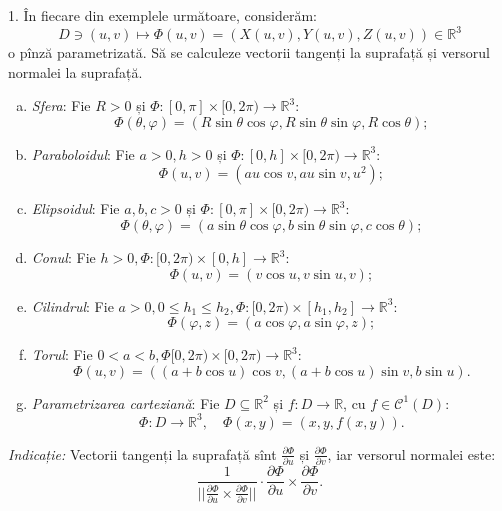 \documentclass[11pt,a4paper]{article}
\newcommand\kal{\mathcal}
\newcommand\seq{\subseteq}
\newcommand\RR{\mathbb{R}}
\theoremstyle{dotless}
\theoremstyle{dotlessdr}
\begin{document}
1. În fiecare din exemplele următoare, considerăm:
\[
  D \ni (u,v) \mapsto \Phi(u,v) = (X(u,v), Y(u,v), Z(u,v)) \in \RR^3
\]
o pînză parametrizată. Să se calculeze vectorii tangenți la suprafață și
versorul normalei la suprafață.

\begin{enumerate}[(a)]
\item \emph{Sfera}: Fie $R > 0$ și $\Phi : [0, \pi] \times [0, 2\pi) \to \RR^3$:
  \[
    \Phi(\theta, \varphi) = (R\sin \theta \cos \varphi, R \sin \theta \sin \varphi, R \cos \theta);
  \]
\item \emph{Paraboloidul}: Fie $a > 0, h > 0$ și $\Phi : [0, h] \times [0, 2\pi) \to \RR^3$:
  \[
    \Phi(u, v) = (au\cos v, au\sin v, u^2);
  \]
\item \emph{Elipsoidul}: Fie $a, b, c > 0$ și $\Phi : [0, \pi] \times [0, 2\pi) \to \RR^3$:
  \[
    \Phi(\theta, \varphi) = (a \sin\theta \cos \varphi, b \sin \theta \sin \varphi, c \cos \theta);
  \]
\item \emph{Conul}: Fie $h > 0, \Phi : [0, 2\pi) \times [0, h] \to \RR^3$:
  \[
    \Phi(u, v) = (v \cos u, v \sin u, v);
  \]
\item \emph{Cilindrul}: Fie $a > 0, 0 \leq h_1 \leq h_2, \Phi : [0, 2\pi) \times [h_1, h_2] \to \RR^3$:
  \[
    \Phi(\varphi, z) = (a \cos \varphi, a \sin \varphi, z);
  \]
\item \emph{Torul}: Fie $0 < a < b, \Phi [0, 2\pi) \times [0, 2\pi) \to \RR^3$:
  \[
    \Phi(u, v) = ((a + b\cos u) \cos v, (a + b \cos u) \sin v, b \sin u).
  \]
\item \emph{Parametrizarea carteziană}: Fie $D \seq \RR^2$ și $f : D \to \RR$, cu
  $f \in \kal{C}^1(D)$:
  \[
    \Phi : D \to \RR^3, \quad \Phi(x, y) = (x, y, f(x,y)).
  \]
\end{enumerate}

\emph{Indicație:} Vectorii tangenți la suprafață sînt $\frac{\partial \Phi}{\partial u}$ și
$\frac{\partial \Phi}{\partial v}$, iar versorul normalei este:
\[
  \frac{1}{\Big|\Big| \frac{\partial \Phi}{\partial u} \times \frac{\partial \Phi}{\partial v}\Big|\Big|}
    \cdot \frac{\partial \Phi}{\partial u} \times \frac{\partial \Phi}{\partial v}.
\]

\vspace{1cm}
\end{document}
